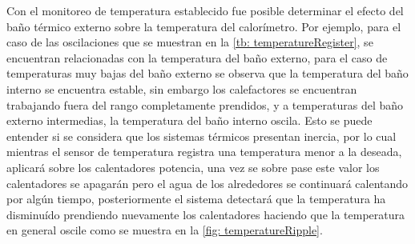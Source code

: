 	Con el monitoreo de temperatura establecido fue posible determinar el efecto del baño térmico externo sobre la temperatura del calorímetro. Por ejemplo, para el caso de las oscilaciones que se muestran en la \autoref{tb: temperatureRegister}, se encuentran relacionadas con la temperatura del baño externo, para el caso de temperaturas muy bajas del baño externo se observa que la temperatura del baño interno se encuentra estable, sin embargo los calefactores se encuentran trabajando fuera del rango completamente prendidos, y a temperaturas del baño externo intermedias, la temperatura del baño interno oscila. Esto se puede entender si se considera que los sistemas térmicos presentan inercia, por lo cual mientras el sensor de temperatura registra una temperatura menor a la deseada, aplicará sobre los calentadores potencia, una vez se sobre pase este valor los calentadores se apagarán pero el agua de los alrededores se continuará calentando por algún tiempo, posteriormente el sistema detectará que la temperatura ha disminuído prendiendo nuevamente los calentadores haciendo que la temperatura en general oscile como se muestra en la \autoref{fig: temperatureRipple}.
